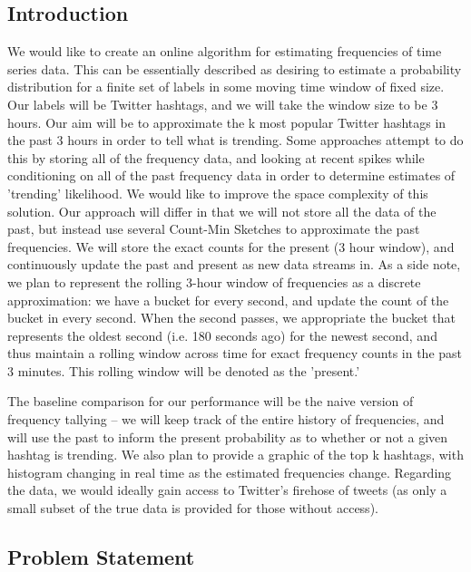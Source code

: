 \documentclass[twoside]{article}
\begin{document}
\begin{multicols}{2} %

\section{Introduction} \label{sec:Intro}

We would like to create an online algorithm for estimating frequencies of time series data. This can be essentially described as desiring to estimate a probability distribution for a finite set of labels in some moving time window of fixed size. Our labels will be Twitter hashtags, and we will take the window size to be 3 hours. Our aim will be to approximate the k most popular Twitter hashtags in the past 3 hours in order to tell what is trending. Some approaches attempt to do this by storing all of the frequency data, and looking at recent spikes while conditioning on all of the past frequency data in order to determine estimates of 'trending' likelihood. We would like to improve the space complexity of this solution. Our approach will differ in that we will not store all the data of the past, but instead use several Count-Min Sketches to approximate the past frequencies. We will store the exact counts for the present (3 hour window), and continuously update the past and present as new data streams in. As a side note, we plan to represent the rolling 3-hour window of frequencies as a discrete approximation: we have a bucket for every second, and update the count of the bucket in every second. When the second passes, we appropriate the bucket that represents the oldest second (i.e. 180 seconds ago) for the newest second, and thus maintain a rolling window across time for exact frequency counts in the past 3 minutes. This rolling window will be denoted as the 'present.'

The baseline comparison for our performance will be the naive version of frequency tallying -- we will keep track of the entire history of frequencies, and will use the past to inform the present probability as to whether or not a given hashtag is trending. We also plan to provide a graphic of the top k hashtags, with histogram changing in real time as the estimated frequencies change. Regarding the data, we would ideally gain access to Twitter's firehose of tweets (as only a small subset of the true data is provided for those without access). 

\subsection{Problem Statement} 


\end{multicols}
\end{document}
